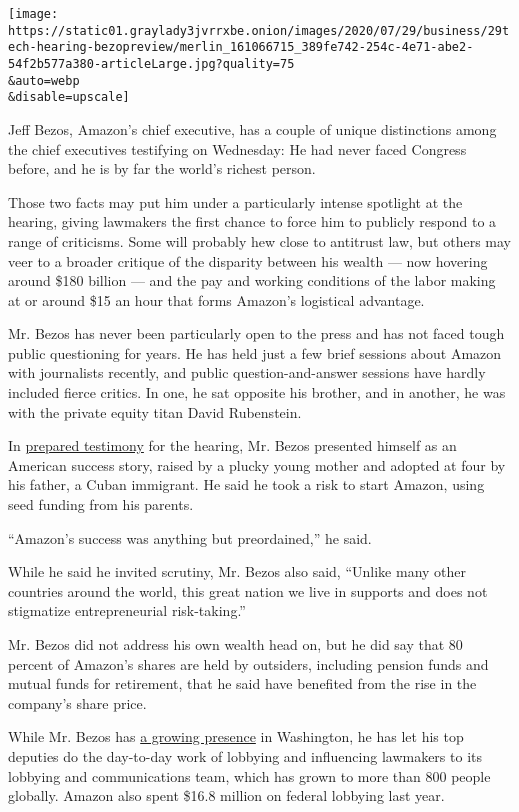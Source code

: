 \texttt{[image: https://static01.graylady3jvrrxbe.onion/images/2020/07/29/business/29tech-hearing-bezopreview/merlin\_161066715\_389fe742-254c-4e71-abe2-54f2b577a380-articleLarge.jpg?quality=75\\\&auto=webp\\\&disable=upscale]}

Jeff Bezos, Amazon's chief executive, has a couple of unique
distinctions among the chief executives testifying on Wednesday: He had
never faced Congress before, and he is by far the world's richest
person.

Those two facts may put him under a particularly intense spotlight at
the hearing, giving lawmakers the first chance to force him to publicly
respond to a range of criticisms. Some will probably hew close to
antitrust law, but others may veer to a broader critique of the
disparity between his wealth --- now hovering around \$180 billion ---
and the pay and working conditions of the labor making at or around \$15
an hour that forms Amazon's logistical advantage.

Mr. Bezos has never been particularly open to the press and has not
faced tough public questioning for years. He has held just a few brief
sessions about Amazon with journalists recently, and public
question-and-answer sessions have hardly included fierce critics. In
one, he sat opposite his brother, and in another, he was with the
private equity titan David Rubenstein.

In
\href{https://blog.aboutamazon.com/policy/statement-by-jeff-bezos-to-the-u-s-house-committee-on-the-judiciary}{prepared
testimony} for the hearing, Mr. Bezos presented himself as an American
success story, raised by a plucky young mother and adopted at four by
his father, a Cuban immigrant. He said he took a risk to start Amazon,
using seed funding from his parents.

``Amazon's success was anything but preordained,'' he said.

While he said he invited scrutiny, Mr. Bezos also said, ``Unlike many
other countries around the world, this great nation we live in supports
and does not stigmatize entrepreneurial risk-taking.''

Mr. Bezos did not address his own wealth head on, but he did say that 80
percent of Amazon's shares are held by outsiders, including pension
funds and mutual funds for retirement, that he said have benefited from
the rise in the company's share price.

While Mr. Bezos has
\href{https://www.nytimes3xbfgragh.onion/2020/07/27/business/jeff-bezos-amazon-congress.html}{a
growing presence} in Washington, he has let his top deputies do the
day-to-day work of lobbying and influencing lawmakers to its lobbying
and communications team, which has grown to more than 800 people
globally. Amazon also spent \$16.8 million on federal lobbying last
year.

